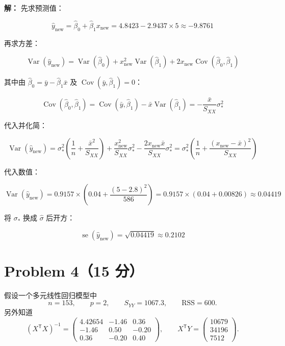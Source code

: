 \documentclass[12pt,a4paper]{article}
\begin{document}
\begin{answerbox}
\textbf{解：}
先求预测值：

$$
\hat{y}_{\mathrm{new}}=\hat{\beta}_0+\hat{\beta}_1x_{\mathrm{new}}=4.8423-2.9437\times 5\approx-9.8761
$$

再求方差：

$$
\operatorname{Var}(\hat{y}_{\mathrm{new}})=\operatorname{Var}(\hat{\beta}_0)+x_{\mathrm{new}}^2\operatorname{Var}(\hat{\beta}_1)+2x_{\mathrm{new}}\operatorname{Cov}(\hat{\beta}_0,\hat{\beta}_1)
$$

其中由 $\hat{\beta}_0=\bar{y}-\hat{\beta}_1\bar{x}$ 及 $\operatorname{Cov}(\bar{y},\hat{\beta}_1)=0$：

$$
\operatorname{Cov}(\hat{\beta}_0,\hat{\beta}_1)=\operatorname{Cov}(\bar{y},\hat{\beta}_1)-\bar{x}\operatorname{Var}(\hat{\beta}_1)=-\frac{\bar{x}}{S_{XX}}\sigma_*^2
$$

代入并化简：

$$
\operatorname{Var}(\hat{y}_{\mathrm{new}})=\sigma_*^2\left(\frac{1}{n}+\frac{\bar{x}^2}{S_{XX}}\right)+\frac{x_{\mathrm{new}}^2}{S_{XX}}\sigma_*^2-\frac{2x_{\mathrm{new}}\bar{x}}{S_{XX}}\sigma_*^2=\sigma_*^2\left(\frac{1}{n}+\frac{(x_{\mathrm{new}}-\bar{x})^2}{S_{XX}}\right)
$$

代入数值：

$$
\operatorname{Var}(\hat{y}_{\mathrm{new}})=0.9157\times\left(0.04+\frac{(5-2.8)^2}{586}\right)=0.9157\times\left(0.04+0.00826\right)\approx 0.04419
$$

将 $\sigma_*$ 换成 $\hat{\sigma}$ 后开方：

$$
\operatorname{se}(\hat{y}_{\mathrm{new}})=\sqrt{0.04419}\approx 0.2102
$$
\end{answerbox}


\section{Problem 4（15 分）}

假设一个多元线性回归模型中
\[
  n=153,\qquad p=2,\qquad S_{YY}=1067.3,\qquad \mathrm{RSS}=600.
\]
另外知道
\[
  (X^\mathsf{T}X)^{-1}
  =
  \begin{pmatrix}
    4.42654 & -1.46 & 0.36 \\
    -1.46   & 0.50  & -0.20 \\
    0.36    & -0.20 & 0.40
  \end{pmatrix},
  \qquad
  X^\mathsf{T}Y
  =
  \begin{pmatrix}
    10679 \\
    34196 \\
    7512
  \end{pmatrix}.
\]
\end{document}

